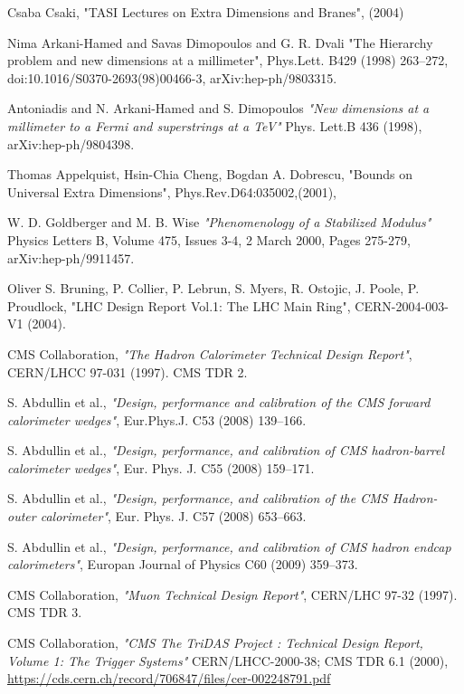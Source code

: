 \documentclass[a4paper,12pt,oneside]{report}
\begin{document}
\begin{thebibliography}{9}
Csaba Csaki,
"TASI Lectures on Extra Dimensions and Branes",
 (2004)


Nima Arkani-Hamed and Savas Dimopoulos and G. R. Dvali
"The Hierarchy problem and new dimensions at a millimeter", 
Phys.Lett. B429 (1998) 263–272, doi:10.1016/S0370-2693(98)00466-3,
arXiv:hep-ph/9803315.

Antoniadis and N. Arkani-Hamed and S. Dimopoulos
\emph{"New dimensions at a millimeter to a Fermi and superstrings at a TeV"}
Phys. Lett.B 436 (1998), arXiv:hep-ph/9804398.

Thomas Appelquist, Hsin-Chia Cheng, Bogdan A. Dobrescu, 
"Bounds on Universal Extra Dimensions",
Phys.Rev.D64:035002,(2001),


W. D. Goldberger and M. B. Wise 
\emph{"Phenomenology of a Stabilized Modulus"}
Physics Letters B, Volume 475, Issues 3-4, 2 March 2000, Pages 275-279, arXiv:hep-ph/9911457.

Oliver S. Bruning, P. Collier, P. Lebrun, S. Myers, R. Ostojic, J. Poole, P. Proudlock,
"LHC Design Report Vol.1: The LHC Main Ring", CERN-2004-003-V1 (2004).	

  CMS Collaboration,
  \emph{"The Hadron Calorimeter Technical Design Report"},
  CERN/LHCC   97-031 (1997). CMS TDR 2. 
  
S. Abdullin et al., \emph{"Design, performance and calibration of the CMS forward calorimeter wedges"}, Eur.Phys.J. C53 (2008) 139–166.

S. Abdullin et al., \emph{"Design, performance, and calibration of CMS hadron-barrel calorimeter wedges"}, Eur. Phys. J. C55 (2008) 159–171.

S. Abdullin et al., \emph{"Design, performance, and calibration of the CMS Hadron- outer calorimeter"}, Eur. Phys. J. C57 (2008) 653–663.

S. Abdullin et al., \emph{"Design, performance, and calibration of CMS hadron endcap calorimeters"}, Europan Journal of Physics C60
(2009) 359–373.

  CMS Collaboration,
  \emph{"Muon Technical Design Report"},
  CERN/LHC  97-32 (1997). CMS TDR 3.

  CMS Collaboration,
  \emph{"CMS The TriDAS Project : Technical Design Report, Volume 1: The Trigger Systems"}
   CERN/LHCC-2000-38; CMS TDR 6.1 (2000),  
   \url{https://cds.cern.ch/record/706847/files/cer-002248791.pdf}


\end{thebibliography}
\end{document}
